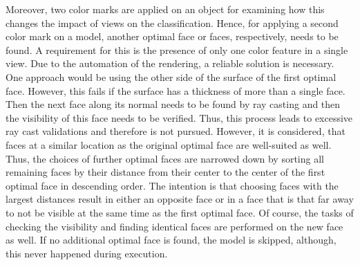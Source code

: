 Moreover, two color marks are applied on an object for examining how this changes the impact of views on the classification.
Hence, for applying a second color mark on a model, another optimal face or faces, respectively, needs to be found.
A requirement for this is the presence of only one color feature in a single view.
Due to the automation of the rendering, a reliable solution is necessary.
One approach would be using the other side of the surface of the first optimal face.
However, this fails if the surface has a thickness of more than a single face.
Then the next face along its normal needs to be found by ray casting and then the visibility of this face needs to be verified.
Thus, this process leads to excessive ray cast validations and therefore is not pursued.
However, it is considered, that faces at a similar location as the original optimal face are well-suited as well.
Thus, the choices of further optimal faces are narrowed down by sorting all remaining faces by their distance from their center to the center of the first optimal face in descending order.
The intention is that choosing faces with the largest distances result in either an opposite face or in a face that is that far away to not be visible at the same time as the first optimal face.
Of course, the tasks of checking the visibility and finding identical faces are performed on the new face as well.
If no additional optimal face is found, the model is skipped, although, this never happened during execution.